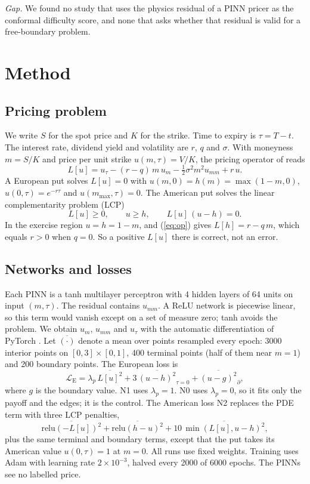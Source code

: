 \documentclass[conference]{IEEEtran}
\begin{document}
\emph{Gap.} We found no study that uses the physics residual of a PINN pricer as the conformal difficulty score, and none that asks whether that residual is valid for a free-boundary problem.

\section{Method}
\subsection{Pricing problem}
We write $S$ for the spot price and $K$ for the strike. Time to expiry is $\tau=T-t$. The interest rate, dividend yield and volatility are $r$, $q$ and $\sigma$. With moneyness $m=S/K$ and price per unit strike $u(m,\tau)=V/K$, the pricing operator of \cite{black1973pricing,merton1973theory} reads
\begin{equation}
L[u]=u_\tau-(r-q)\,m\,u_m-\tfrac12\sigma^2m^2u_{mm}+r\,u. \label{eq:op}
\end{equation}
A European put solves $L[u]=0$ with $u(m,0)=h(m)=\max(1-m,0)$, $u(0,\tau)=e^{-r\tau}$ and $u(m_{\max},\tau)=0$. The American put solves the linear complementarity problem (LCP)
\begin{equation}
L[u]\ge0,\qquad u\ge h,\qquad L[u]\,(u-h)=0. \label{eq:lcp}
\end{equation}
In the exercise region $u=h=1-m$, and (\ref{eq:op}) gives $L[h]=r-q\,m$, which equals $r>0$ when $q=0$. So a positive $L[u]$ there is correct, not an error.

\subsection{Networks and losses}
Each PINN is a tanh multilayer perceptron with 4 hidden layers of 64 units on input $(m,\tau)$. The residual contains $u_{mm}$. A ReLU network is piecewise linear, so this term would vanish except on a set of measure zero; tanh avoids the problem. We obtain $u_m$, $u_{mm}$ and $u_\tau$ with the automatic differentiation of PyTorch \cite{paszke2019pytorch}. Let $\overline{(\cdot)}$ denote a mean over points resampled every epoch: 3000 interior points on $[0,3]\times[0,1]$, 400 terminal points (half of them near $m=1$) and 200 boundary points. The European loss is
\begin{equation}
\mathcal L_{\mathrm{E}}=\lambda_{p}\,\overline{L[u]^2}+3\,\overline{(u-h)^2}_{\tau=0}+\overline{(u-g)^2}_{\partial}, \label{eq:le}
\end{equation}
where $g$ is the boundary value. N1 uses $\lambda_p=1$. N0 uses $\lambda_p=0$, so it fits only the payoff and the edges; it is the control. The American loss N2 replaces the PDE term with three LCP penalties,
\begin{equation}
\overline{\mathrm{relu}(-L[u])^2}+\overline{\mathrm{relu}(h-u)^2}+10\,\overline{\min(L[u],u-h)^2}, \label{eq:la}
\end{equation}
plus the same terminal and boundary terms, except that the put takes its American value $u(0,\tau)=1$ at $m=0$. All runs use fixed weights. Training uses Adam with learning rate $2\times10^{-3}$, halved every 2000 of 6000 epochs. The PINNs see no labelled price.
\end{document}
